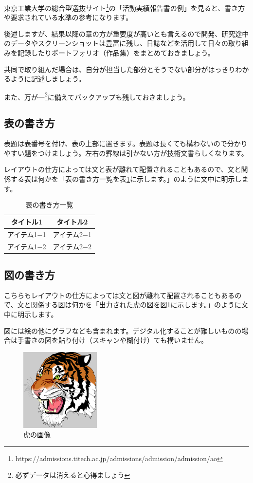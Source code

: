 \documentclass[dvipdfmx, a4paper]{jsarticle}
\begin{document}
東京工業大学の総合型選抜サイト\footnote{https://admissions.titech.ac.jp/admissions/admission/admission/ao}の「活動実績報告書の例」を見ると、書き方や要求されている水準の参考になります。

後述しますが、結果以降の章の方が重要度が高いとも言えるので開発、研究途中のデータやスクリーンショットは豊富に残し、日誌などを活用して日々の取り組みを記録したりポートフォリオ（作品集）をまとめておきましょう。

共同で取り組んだ場合は、自分が担当した部分とそうでない部分がはっきりわかるように記述しましょう。

また、万が一\footnote{必ずデータは消えると心得ましょう}に備えてバックアップも残しておきましょう。

\subsection{表の書き方}
表題は表番号を付け、表の上部に置きます。表題は長くても構わないので分かりやすい題をつけましょう。左右の罫線は引かない方が技術文書らしくなります。

レイアウトの仕方によっては文と表が離れて配置されることもあるので、文と関係する表は何かを「表の書き方一覧を表\ref{tab:label_how_to_draw_table}に示します。」のように文中に明示します。
　
\begin{table}[htbp]
    \centering
    \caption{表の書き方一覧}
    \label{tab:label_how_to_draw_table}
    \begin{tabular}{c|c} \hline
        タイトル1 & タイトル2 \\ \hline \hline
        アイテム1−1 & アイテム2−1 \\ \hline
        アイテム1−2 & アイテム2−2 \\ \hline
    \end{tabular}
\end{table}

\subsection{図の書き方}
こちらもレイアウトの仕方によっては文と図が離れて配置されることもあるので、文と関係する図は何かを「出力された虎の図を図\ref{fig:label_tiger}に示します。」のように文中に明示します。

図には絵の他にグラフなども含まれます。デジタル化することが難しいものの場合は手書きの図を貼り付け（スキャンや糊付け）ても構いません。

\begin{figure}[htbp]
    \centering
    \includegraphics[width=4cm, clip]{examples_tiger.eps}
    \caption{虎の画像}
    \label{fig:label_tiger}
\end{figure}
\end{document}
